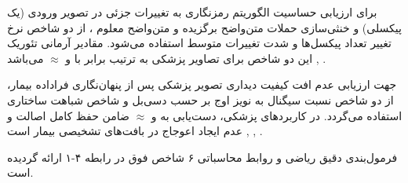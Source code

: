 


برای ارزیابی حساسیت الگوریتم رمزنگاری به تغییرات جزئی در تصویر ورودی (یک پیکسلی) و خنثی‌سازی حملات متن‌واضح برگزیده  و متن‌واضح معلوم ، از دو شاخص نرخ تغییر تعداد پیکسل‌ها  و شدت تغییرات متوسط  استفاده می‌شود. مقادیر آرمانی تئوریک این دو شاخص برای تصاویر پزشکی به ترتیب برابر با  و  \ensuremath{\approx}  می‌باشد , .\par




جهت ارزیابی عدم افت کیفیت دیداری تصویر پزشکی پس از پنهان‌نگاری فراداده بیمار، از دو شاخص نسبت سیگنال به نویز اوج  بر حسب دسی‌بل  و شاخص شباهت ساختاری  استفاده می‌گردد. در کاربردهای پزشکی، دست‌یابی به  و  \ensuremath{\approx}  ضامن حفظ کامل اصالت و عدم ایجاد اعوجاج در بافت‌های تشخیصی بیمار است , , .\par



فرمول‌بندی دقیق ریاضی و روابط محاسباتی ۶ شاخص فوق در رابطه ۴{-}۱ ارائه گردیده است.\par




